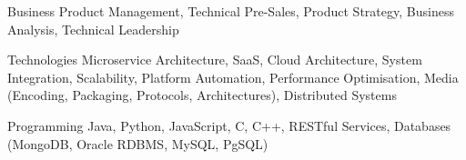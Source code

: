 


\begin{cvskills}


\cvskill
{Business} %
{Product Management, Technical Pre-Sales, Product Strategy, Business Analysis, Technical Leadership} %


\cvskill
{Technologies} %
{Microservice Architecture, SaaS, Cloud Architecture, System Integration, Scalability, Platform Automation, Performance Optimisation, Media (Encoding, Packaging, Protocols, Architectures), Distributed Systems} %


\cvskill
{Programming} %
{Java, Python, JavaScript, C, C++, RESTful Services, Databases (MongoDB, Oracle RDBMS, MySQL, PgSQL)} %


\end{cvskills}
